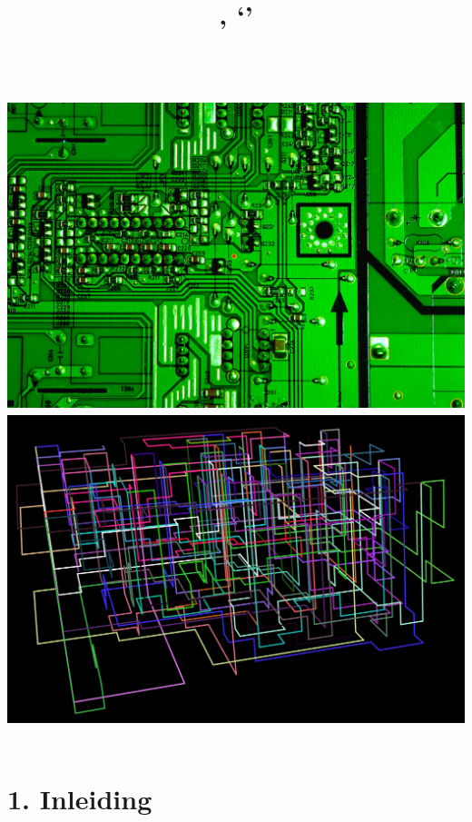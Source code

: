 \documentclass{article}
\title{
	\vfill
	\textmd{\textbf{\hmwkTitle}}\\
	\vspace{0.1in}\large{\textit{\hmwkAuthorName}} \\
	\normalsize\vspace{0.1in}\small{\hmwkClass, `\hmwkClassTime'\\ \hmwkClassInstructor\\ \hmwkDueDate} \\
	\vfill \vfill \vfill
	\includegraphics[width=0.75\columnwidth]{Circuit-board}
	\vfill
	\includegraphics[width=0.75\columnwidth]{3dviz}
	\vfill
}
\date{} %
\begin{document}
	
	\maketitle
	
	
	
	\newpage
	\renewcommand{\cftdot}{.}
	\renewcommand{\contentsname}{INHOUDSOPGAVE}
	\tableofcontents
	\newpage
	
	

	\section{1. Inleiding}
	
\end{document}
